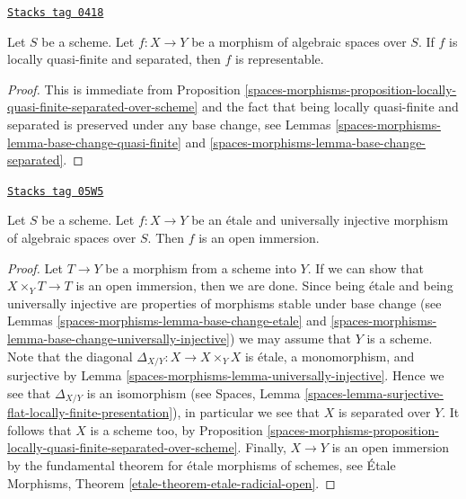\begin{lemma}
\label{spaces-morphisms-lemma-locally-quasi-finite-separated-representable}
\href{https://stacks.math.columbia.edu/tag/0418}{\texttt{Stacks tag 0418}}

Let $S$ be a scheme. Let $f : X \to Y$ be a morphism of algebraic
spaces over $S$. If $f$ is locally quasi-finite and separated, then
$f$ is representable.
\end{lemma}

\begin{proof}
This is immediate from
Proposition \ref{spaces-morphisms-proposition-locally-quasi-finite-separated-over-scheme}
and the fact that being locally quasi-finite and separated is
preserved under any base change, see
Lemmas \ref{spaces-morphisms-lemma-base-change-quasi-finite} and
\ref{spaces-morphisms-lemma-base-change-separated}.
\end{proof}

\begin{lemma}
\label{spaces-morphisms-lemma-etale-universally-injective-open}
\href{https://stacks.math.columbia.edu/tag/05W5}{\texttt{Stacks tag 05W5}}


Let $S$ be a scheme. Let $f : X \to Y$ be an \'etale and universally
injective morphism of algebraic spaces over $S$. Then $f$ is an open
immersion.
\end{lemma}

\begin{proof}
Let $T \to Y$ be a morphism from a scheme into $Y$.
If we can show that $X \times_Y T \to T$ is an open immersion, then we
are done. Since being \'etale and being universally injective are
properties of morphisms stable under base change (see
Lemmas \ref{spaces-morphisms-lemma-base-change-etale} and
\ref{spaces-morphisms-lemma-base-change-universally-injective})
we may assume that $Y$ is a scheme. Note that the
diagonal $\Delta_{X/Y} : X \to X \times_Y X$ is \'etale, a monomorphism, and
surjective by
Lemma \ref{spaces-morphisms-lemma-universally-injective}.
Hence we see that $\Delta_{X/Y}$ is an isomorphism (see
Spaces, Lemma
\ref{spaces-lemma-surjective-flat-locally-finite-presentation}),
in particular we see that $X$ is separated over $Y$.
It follows that $X$ is a scheme too, by
Proposition \ref{spaces-morphisms-proposition-locally-quasi-finite-separated-over-scheme}.
Finally, $X \to Y$ is an open immersion by the fundamental theorem
for \'etale morphisms of schemes, see
\'Etale Morphisms, Theorem \ref{etale-theorem-etale-radicial-open}.
\end{proof}

